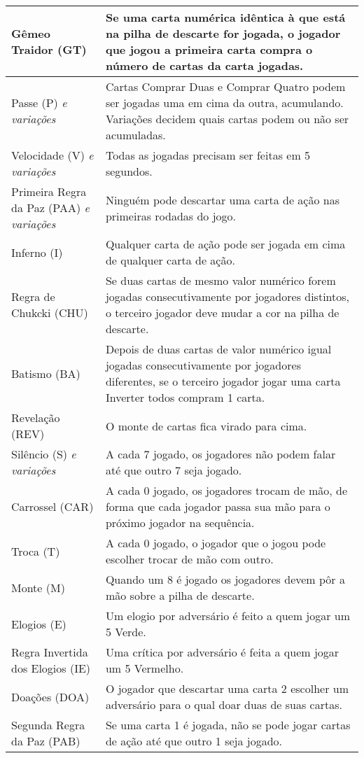 \begin{center}
\begin{longtable}{|p{4cm}|p{6.5cm}|}
Gêmeo Traidor (GT) & Se uma carta numérica idêntica à que está na pilha de descarte for jogada, o jogador que jogou a primeira carta compra o número de cartas da carta jogadas. \\ \hline
Passe (P) \emph{e variações} & Cartas Comprar Duas e Comprar Quatro podem ser jogadas uma em cima da outra, acumulando. Variações decidem quais cartas podem ou não ser acumuladas. \\ \hline
Velocidade (V) \emph{e variações} & Todas as jogadas precisam ser feitas em 5 segundos. \\ \hline
Primeira Regra da Paz (PAA) \emph{e variações} & Ninguém pode descartar uma carta de ação nas primeiras rodadas do jogo. \\ \hline
Inferno (I) & Qualquer carta de ação pode ser jogada em cima de qualquer carta de ação. \\ \hline
Regra de Chukcki (CHU) & Se duas cartas de mesmo valor numérico forem jogadas consecutivamente por jogadores distintos, o terceiro jogador deve mudar a cor na pilha de descarte. \\ \hline
Batismo (BA) & Depois de duas cartas de valor numérico igual jogadas consecutivamente por jogadores diferentes, se o terceiro jogador jogar uma carta Inverter todos compram 1 carta. \\ \hline
Revelação (REV) & O monte de cartas fica virado para cima. \\ \hline
Silêncio (S) \emph{e variações} & A cada 7 jogado, os jogadores não podem falar até que outro 7 seja jogado. \\ \hline
Carrossel (CAR) & A cada 0 jogado, os jogadores trocam de mão, de forma que cada jogador passa sua mão para o próximo jogador na sequência. \\ \hline
Troca (T) & A cada 0 jogado, o jogador que o jogou pode escolher trocar de mão com outro. \\ \hline
Monte (M) & Quando um 8 é jogado os jogadores devem pôr a mão sobre a pilha de descarte. \\ \hline
Elogios (E) & Um elogio por adversário é feito a quem jogar um 5 Verde. \\ \hline
Regra Invertida dos Elogios (IE) & Uma crítica por adversário é feita a quem jogar um 5 Vermelho. \\ \hline
Doações (DOA) & O jogador que descartar uma carta 2 escolher um adversário para o qual doar duas de suas cartas. \\ \hline
Segunda Regra da Paz (PAB) & Se uma carta 1 é jogada, não se pode jogar cartas de ação até que outro 1 seja jogado. \\ \hline 

\end{longtable}
\end{center}
